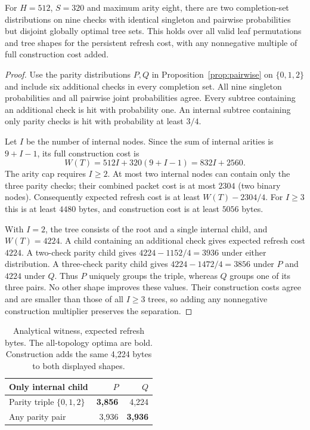 \begin{theorem}\label{thm:pairwise-optimum}
For $H=512$, $S=320$ and maximum arity eight, there are two completion-set
distributions on nine checks with identical singleton and pairwise
probabilities but disjoint globally optimal tree sets. This holds over all
valid leaf permutations and tree shapes for the persistent refresh cost,
with any nonnegative multiple of full construction cost added.
\end{theorem}
\begin{proof}
Use the parity distributions $P,Q$ in Proposition~\ref{prop:pairwise} on
$\{0,1,2\}$ and include six additional checks in every completion set.
All nine singleton probabilities and all pairwise joint probabilities agree.
Every subtree containing an additional check is hit with probability one.
An internal subtree containing only parity checks is hit with probability
at least $3/4$.

Let $I$ be the number of internal nodes. Since the sum of internal arities
is $9+I-1$, its full construction cost is
\[
 W(T)=512I+320(9+I-1)=832I+2560.
\]
The arity cap requires $I\ge2$. At most two internal nodes can contain only
the three parity checks; their combined packet cost is at most $2304$
(two binary nodes). Consequently expected refresh cost is at least
$W(T)-2304/4$. For $I\ge3$ this is at least $4480$ bytes, and construction
cost is at least $5056$ bytes.

With $I=2$, the tree consists of the root and a single internal child, and
$W(T)=4224$. A child containing an additional check gives expected refresh
cost $4224$. A two-check parity child gives $4224-1152/4=3936$ under either
distribution. A three-check parity child gives $4224-1472/4=3856$ under $P$
and $4224$ under $Q$. Thus $P$ uniquely groups the triple, whereas $Q$ groups
one of its three pairs. No other shape improves these values. Their
construction costs agree and are smaller than those of all $I\ge3$ trees,
so adding any nonnegative construction multiplier preserves the separation.
\end{proof}

\begin{table}[H]\centering\small
\caption{Analytical witness, expected refresh bytes. The all-topology optima
are bold. Construction adds the same 4,224 bytes to both displayed shapes.}
\label{tab:pairwise-witness}
\begin{tabular}{@{}lrr@{}}\toprule
Only internal child & $P$ & $Q$\\\midrule
Parity triple $\{0,1,2\}$ & \textbf{3,856} & 4,224\\
Any parity pair & 3,936 & \textbf{3,936}\\\bottomrule
\end{tabular}
\end{table}

